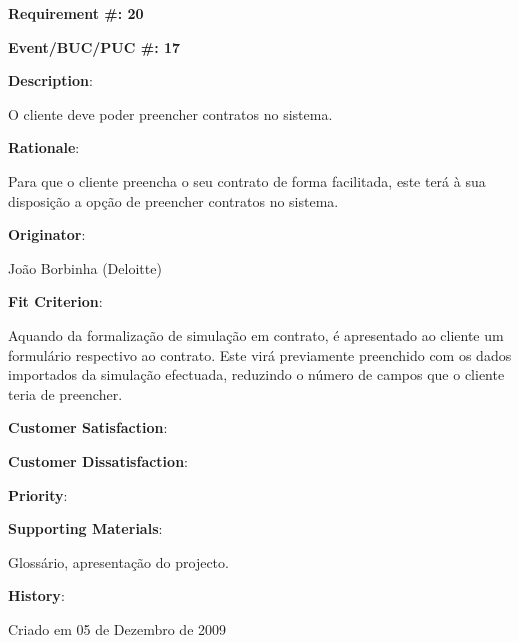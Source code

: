 \pagebreak

\begin{minipage}{0.55\textwidth}
\begin{flushleft}\textbf{Requirement \#: 20}\end{flushleft}
\end{minipage}
\begin{minipage}{0.4\textwidth}
\begin{flushright}\textbf{Event/BUC/PUC \#: 17}\end{flushright}
\end{minipage}

\begin{description}
\item \textbf{Description}:

O cliente deve poder preencher contratos no sistema.\\

\item \textbf{Rationale}:

Para que o cliente preencha o seu contrato de forma facilitada, este terá à sua disposição a opção de preencher contratos no sistema.\\

\item \textbf{Originator}:

João Borbinha (Deloitte)\\

\item \textbf{Fit Criterion}:

Aquando da formalização de simulação em contrato, é apresentado ao cliente um formulário respectivo ao contrato. Este virá previamente preenchido com os dados importados da simulação efectuada, reduzindo o número de campos que o cliente teria de preencher.\\

\begin{minipage}{0.45\textwidth}
\begin{flushleft}\item \textbf{Customer Satisfaction}:\end{flushleft}
\end{minipage}
\begin{minipage}{0.45\textwidth}
\begin{flushleft}\item \textbf{Customer Dissatisfaction}:\end{flushleft}
\end{minipage}

\item \textbf{Priority}:\\

\item \textbf{Supporting Materials}:

Glossário, apresentação do projecto.\\

\item \textbf{History}:

Criado em 05 de Dezembro de 2009\\
\end{description}

